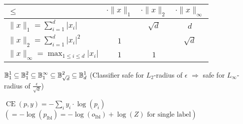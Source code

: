 \centering
\begin{tabular}{|l|c|c|c|}
\hline
$\le$ & $\cdot\|x\|_1$ & $\cdot\|x\|_2$ & $\cdot\|x\|_\infty$ \\\hline

$\|x\|_1=\sum_{i=1}^d \lvert x_i \rvert$ & & $\sqrt{d}$ & $d$ \\\hline

$\|x\|_2=\sum_{i=1}^d \lvert x_i \rvert^2$  & $1$ & & $\sqrt{d}$ \\\hline

$\|x\|_\infty=\max_{1\le i\le d} \lvert x_i \rvert$ & $1$ & $1$ & \\\hline
\end{tabular}

\raggedright

$\operatorname*{\mathbb{B}}_1^1 \subseteq \operatorname*{\mathbb{B}}_1^2 \subseteq \operatorname*{\mathbb{B}}_1^\infty \subseteq \operatorname*{\mathbb{B}}_{\sqrt{d}}^2 \subseteq \operatorname*{\mathbb{B}}_d^1$
(Classifier safe for $L_2$-radius of $\epsilon$ $\Rightarrow$ safe for $L_\infty$-radius of $\frac{\epsilon}{\sqrt{d}}$)

$\operatorname{CE}(p, y) = - \sum_i y_i \cdot \log(p_i)$
$(= -\log(p_\text{lbl}) = -\log(o_\text{lbl}) + \log(Z) \text{ for single label})$